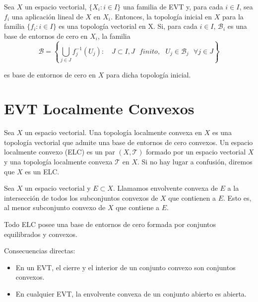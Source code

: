 \begin{proposicion}
Sea $X$ un espacio vectorial, $\{X_{i} : i\in I \}$ una familia de EVT y, para cada $i \in I$, sea $f_{i}$ una aplicación lineal de $X$ en $X_{i}$. Entonces, la topología inicial en $X$ para la familia $\{f_{i} : i\in I \}$ es una topología vectorial en X. Si, para cada $i\in I$, $\mathcal{B}_{i}$ es una base de entornos de cero en $X_{i}$, la familia
\begin{equation}
\mathcal{B} = \left\{ \bigcup_{j\in J} f_{j}^{-1}(U_{j}) : \quad J \subset I,  J \text{ } finito,\text{ } U_{j}\in \mathcal{B}_{j} \text{ } \forall j\in J\right\}
\end{equation}

es base de entornos de cero en $X$ para dicha topología inicial. 
\end{proposicion}

\section{EVT Localmente Convexos}

\begin{definicion}
Sea $X$ un espacio vectorial. Una topología localmente convexa en $X$ es una topología vectorial que admite una base de entornos de cero convexos. Un espacio localmente convexo (ELC) es un par $(X,\mathcal{T})$ formado por un espacio vectorial $X$ y una topología localmente convexa $\mathcal{T}$ en $X$. Si no hay lugar a confusión, diremos que $X$ es un ELC.
\end{definicion}

\begin{definicion}
Sea $X$ un espacio vectorial y $E\subset X$. Llamamos envolvente convexa de $E$ a la intersección de todos los subconjuntos convexos de $X$ que contienen a $E$. Esto es, al menor subconjunto convexo de $X$ que contiene a $E$.
\end{definicion}

\begin{teorema}
Todo ELC posee una base de entornos de cero formada por conjuntos equilibrados y convexos.
\end{teorema}

\begin{observacion}
Consecuencias directas:
\begin{itemize}
	\item En un EVT, el cierre y el interior de un conjunto convexo son conjuntos convexos.
	\item En cualquier EVT, la envolvente convexa de un conjunto abierto es abierta.
\end{itemize}
\end{observacion}


